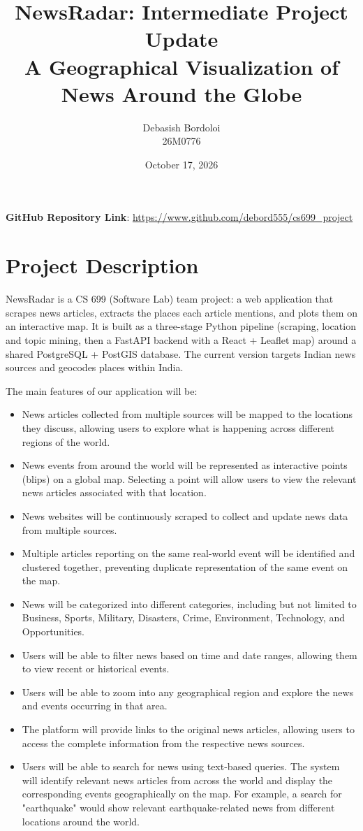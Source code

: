 \documentclass[11pt,a4paper]{article}
\title{NewsRadar: Intermediate Project Update\\[4pt]
  \large A Geographical Visualization of News Around the Globe}
\author{Debasish Bordoloi\\26M0776}
\date{October 17, 2026}
\begin{document}
\maketitle

\textbf{GitHub Repository Link}: \href{https://www.github.com/debord555/cs699\_project}{https://www.github.com/debord555/cs699\_project}

\section{Project Description}

NewsRadar is a CS 699 (Software Lab) team project: a web application that
scrapes news articles, extracts the places each article mentions, and plots
them on an interactive map. It is built as a three-stage Python pipeline
(scraping, location and topic mining, then a FastAPI backend with a
React + Leaflet map) around a shared PostgreSQL + PostGIS database. The
current version targets Indian news sources and geocodes places within India.

The main features of our application will be:

\begin{itemize}
    \item News articles collected from multiple sources will be mapped to the locations they discuss, allowing users to explore what is happening across different regions of the world.
    \item News events from around the world will be represented as interactive points (blips) on a global map. Selecting a point will allow users to view the relevant news articles associated with that location.
    \item News websites will be continuously scraped to collect and update news data from multiple sources.
    \item Multiple articles reporting on the same real-world event will be identified and clustered together, preventing duplicate representation of the same event on the map.
    \item News will be categorized into different categories, including but not limited to Business, Sports, Military, Disasters, Crime, Environment, Technology, and Opportunities.
    \item Users will be able to filter news based on time and date ranges, allowing them to view recent or historical events.
    \item Users will be able to zoom into any geographical region and explore the news and events occurring in that area.
    \item The platform will provide links to the original news articles, allowing users to access the complete information from the respective news sources.
    \item Users will be able to search for news using text-based queries. The system will identify relevant news articles from across the world and display the corresponding events geographically on the map. For example, a search for "earthquake" would show relevant earthquake-related news from different locations around the world.
\end{itemize}
\end{document}
